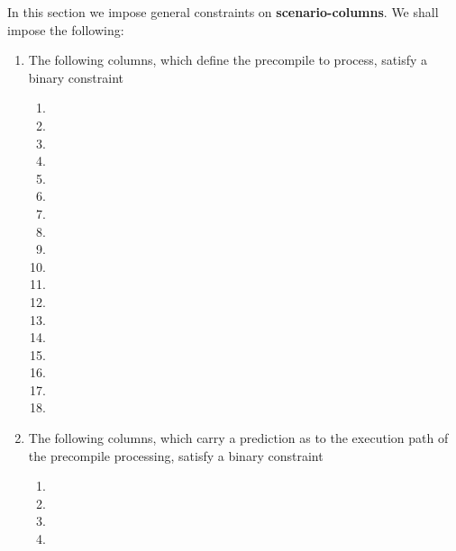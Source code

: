 \begin{center}
\end{center}
In this section we impose general constraints on \textbf{scenario-columns}. We shall impose the following:
\begin{enumerate}
	\item The following columns, which define the precompile to process, satisfy a binary constraint \lispDone{}
		\begin{multicols}{2}
			\begin{enumerate}
				\item \scenEcrecover{}
				\item \scenShaTwo{}
				\item \scenRipemd{}
				\item \scenIdentity{}
				\item \scenModexp{}
				\item \scenEcadd{}
				\item \scenEcmul{}
				\item \scenEcpairing{}
				\item \scenBlake{}
				\item \scenPointEvaluation{}
				\item \scenBlsGOneAdd{}
				\item \scenBlsGOneMsm{}
				\item \scenBlsGTwoAdd{}
				\item \scenBlsGTwoMsm{}
				\item \scenBlsPairingCheck{}
				\item \scenBlsMapFpToGOne{}
				\item \scenBlsMapFpTwoToGTwo{}
				\item[\vspace{\fill}]
			\end{enumerate}
		\end{multicols}
	\item The following columns, which carry a prediction as to the execution path of the precompile processing, satisfy a binary constraint \lispDone{}
		\begin{enumerate}[resume]
			\item \scenPrcFailureKnownToHub{}
			\item \scenPrcFailureKnownToRam{}
			\item \scenPrcSuccessWillRevert{}
			\item \scenPrcSuccessWontRevert{}
		\end{enumerate}
\end{enumerate}
